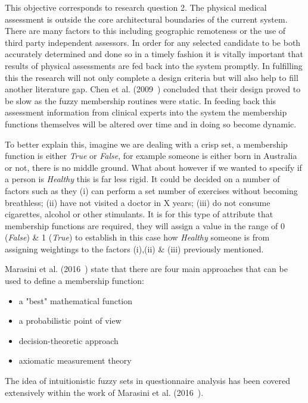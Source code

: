 This objective corresponds to research question 2. The physical medical assessment is outside the core architectural boundaries of the current system. There are many factors to this including geographic remoteness or the use of third party independent assessors. In order for any selected candidate to be both accurately determined and done so in a timely fashion it is vitally important that results of physical assessments are fed back into the system promptly. In fulfilling this the research will not only complete a design criteria but will also help to fill another literature gap. Chen et al. (2009~\cite{chen2009mining}) concluded that their design proved to be slow as the fuzzy membership routines were static. In feeding back this assessment information from clinical experts into the system the membership functions themselves will be altered over time and in doing so become dynamic.

To better explain this, imagine we are dealing with a crisp set, a membership function is either \textit{True} or \textit{False}, for example someone is either born in Australia or not, there is no middle ground. What about however if we wanted to specify if a person is \textit{Healthy} this is far less rigid. It could be decided on a number of factors such as they (i) can perform a set number of exercises without becoming breathless; (ii) have not visited a doctor in X years; (iii) do not consume cigarettes, alcohol or other stimulants. It is for this type of attribute that membership functions are required, they will assign a value in the range of 0 (\textit{False}) \& 1 (\textit{True}) to establish in this case how \textit{Healthy} someone is from assigning weightings to the factors (i),(ii) \& (iii) previously mentioned.

Marasini et al. (2016~\cite{marasini2016intuitionistic}) state that there are four main approaches that can be used
to define a membership function:

\begin{itemize}
    \item a "best" mathematical function
    \item a probabilistic point of view
    \item decision-theoretic approach
    \item axiomatic measurement theory
\end{itemize}

The idea of intuitionistic fuzzy sets in questionnaire analysis has been covered extensively within the work of Marasini et al. (2016~\cite{marasini2016intuitionistic}).

